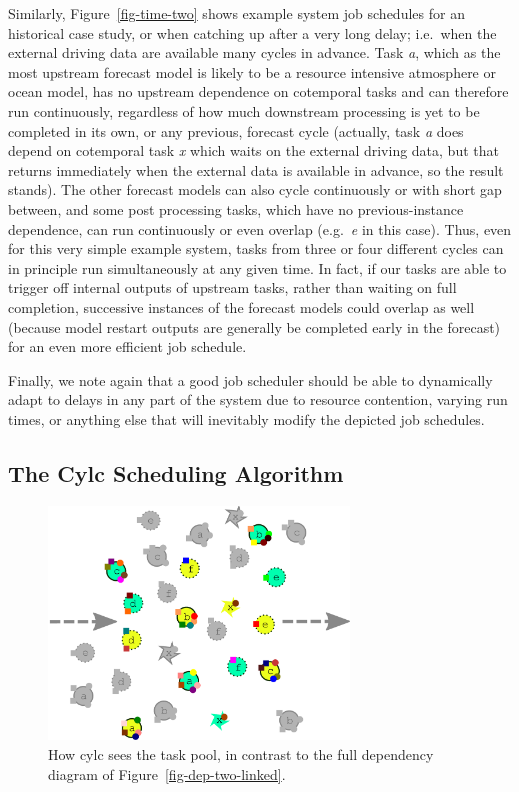 \documentclass[11pt,a4paper]{article}
\begin{document}
Similarly, Figure~\ref{fig-time-two} shows example system job schedules
for an historical case study, or when catching up after a very long
delay; i.e.\ when the external driving data are available many cycles in
advance.  Task {\em a}, which as the most upstream forecast model is
likely to be a resource intensive atmosphere or ocean model, has no
upstream dependence on cotemporal tasks and can therefore run
continuously, regardless of how much downstream processing is yet to be
completed in its own, or any previous, forecast cycle (actually, task
{\em a} does depend on cotemporal task {\em x} which waits on the
external driving data, but that returns immediately when the external
data is available in advance, so the result stands). The other forecast
models can also cycle continuously or with short gap between, and some
post processing tasks, which have no previous-instance dependence, can
run continuously or even overlap (e.g.\ {\em e} in this case). Thus,
even for this very simple example system, tasks from three or four
different cycles can in principle run simultaneously at any given time. 
In fact, if our tasks are able to trigger off internal outputs of 
upstream tasks, rather than waiting on full completion, successive
instances of the forecast models could overlap as well (because model
restart outputs are generally be completed early in the forecast) for an
even more efficient job schedule. 

Finally, we note again that a good job scheduler should be able to
dynamically adapt to delays in any part of the system due to resource
contention, varying run times, or anything else that will inevitably
modify the depicted job schedules. 

\subsection{The Cylc Scheduling Algorithm} 
\label{TheCylcSchedulingAlgorithm}

\begin{figure}
    \begin{center} 
        \includegraphics[width=8cm]{inkscape-svg/task-pool}
    \end{center} 
    \caption[The cylc task pool]{\small How cylc sees the task pool, in
    contrast to the full dependency diagram of Figure~\ref{fig-dep-two-linked}.} 
    \label{fig-task-pool}
\end{figure} 
\end{document}
